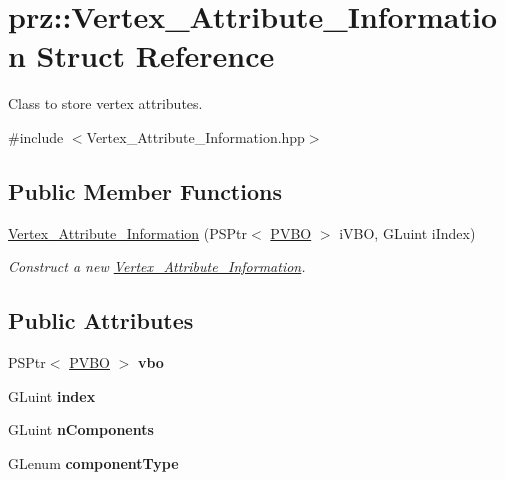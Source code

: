 \hypertarget{structprz_1_1_vertex___attribute___information}{}\section{prz\+::Vertex\+\_\+\+Attribute\+\_\+\+Information Struct Reference}
\label{structprz_1_1_vertex___attribute___information}


Class to store vertex attributes.  




{\ttfamily \#include $<$Vertex\+\_\+\+Attribute\+\_\+\+Information.\+hpp$>$}

\subsection*{Public Member Functions}
\begin{DoxyCompactItemize}
\item 
\mbox{\hyperlink{structprz_1_1_vertex___attribute___information_a614c871d3a18142a85caeba7e6223f49}{Vertex\+\_\+\+Attribute\+\_\+\+Information}} (P\+S\+Ptr$<$ \mbox{\hyperlink{classprz_1_1_vertex___buffer___object}{P\+V\+BO}} $>$ i\+V\+BO, G\+Luint i\+Index)
\begin{DoxyCompactList}\small\item\em Construct a new \mbox{\hyperlink{structprz_1_1_vertex___attribute___information}{Vertex\+\_\+\+Attribute\+\_\+\+Information}}. \end{DoxyCompactList}\end{DoxyCompactItemize}
\subsection*{Public Attributes}
\begin{DoxyCompactItemize}
\item 
\mbox{\label{structprz_1_1_vertex___attribute___information_adef71e5212bcf70b85bd5e04f80b3dfe}} 
P\+S\+Ptr$<$ \mbox{\hyperlink{classprz_1_1_vertex___buffer___object}{P\+V\+BO}} $>$ {\bfseries vbo}
\item 
\mbox{\label{structprz_1_1_vertex___attribute___information_aeec3206b979ab4eac49793f442f67efc}} 
G\+Luint {\bfseries index}
\item 
\mbox{\label{structprz_1_1_vertex___attribute___information_ae456f13700f325c32181256c8bff5f6a}} 
G\+Luint {\bfseries n\+Components}
\item 
\mbox{\label{structprz_1_1_vertex___attribute___information_a359898f1317a428eeb0fa6be2dd089ce}} 
G\+Lenum {\bfseries component\+Type}
\end{DoxyCompactItemize}


